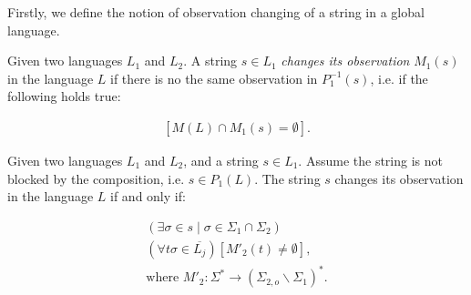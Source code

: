 \documentclass[a4paper, 10pt, conference]{ieeeconf}
\begin{document}
Firstly, we define the notion of observation changing of a string in a global
language.
\begin{definition}Given two languages $L_1$ and $L_2$. A string $s \in
L_1$ \emph{changes its observation} $M_1(s)$ in the language $L$ if
there is no the same observation in $P_1^{-1}(s)$, i.e.
if the following holds true:
\end{definition}
\begin{equation}
\label{def:obs}
\begin{array}{l}
	\left[ M(L) \cap M_1(s) = \emptyset \right].
\end{array}
\end{equation}

\begin{lemma}
\label{lem_changed_observation}
Given two languages $L_1$ and $L_2$, and a string $s \in L_1$.
Assume the string is not blocked by the composition, i.e. $s \in P_1(L)$. The
string $s$ changes its observation in the language $L$ if and
only if:
\end{lemma}
\begin{subequations}\label{lem:obs}
\begin{align}
	(\exists \sigma \in s \mid \sigma \in \Sigma_1 \cap \Sigma_2)
	\label{lem:obs1}
	\\
	(\forall t\sigma \in \overline{L_j})
	\left[M'_2(t) \neq \emptyset \right],
	\label{lem:obs2}
	\\
	\textrm{where } M'_2: \Sigma^* \rightarrow (\Sigma_{2,o} \backslash
	\Sigma_1)^*. 
	\label{lem:obs3}
\end{align}
\end{subequations}
\end{document}
